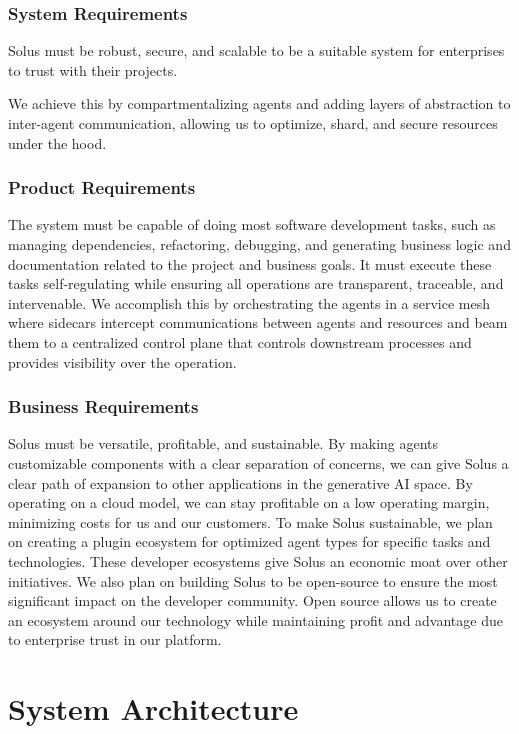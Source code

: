 \documentclass[a4paper,twocolumn,11pt]{quantumarticle}
\begin{document}
\subsubsection{System Requirements}
Solus must be robust, secure, and scalable to be a suitable system for enterprises to trust with their projects.

We achieve this by compartmentalizing agents and adding layers of abstraction to inter-agent communication, allowing us to optimize, shard, and secure resources under the hood.

\subsubsection{Product Requirements}
The system must be capable of doing most software development tasks, such as managing dependencies, refactoring, debugging, and generating business logic and documentation related to the project and business goals. It must execute these tasks self-regulating while ensuring all operations are transparent, traceable, and intervenable. We accomplish this by orchestrating the agents in a service mesh where sidecars intercept communications between agents and resources and beam them to a centralized control plane that controls downstream processes and provides visibility over the operation.

\subsubsection{Business Requirements}
Solus must be versatile, profitable, and sustainable. By making agents customizable components with a clear separation of concerns, we can give Solus a clear path of expansion to other applications in the generative AI space. By operating on a cloud model, we can stay profitable on a low operating margin, minimizing costs for us and our customers. To make Solus sustainable, we plan on creating a plugin ecosystem for optimized agent types for specific tasks and technologies. These developer ecosystems give Solus an economic moat over other initiatives. We also plan on building Solus to be open-source to ensure the most significant impact on the developer community. Open source allows us to create an ecosystem around our technology while maintaining profit and advantage due to enterprise trust in our platform.

\section{System Architecture}
\end{document}
